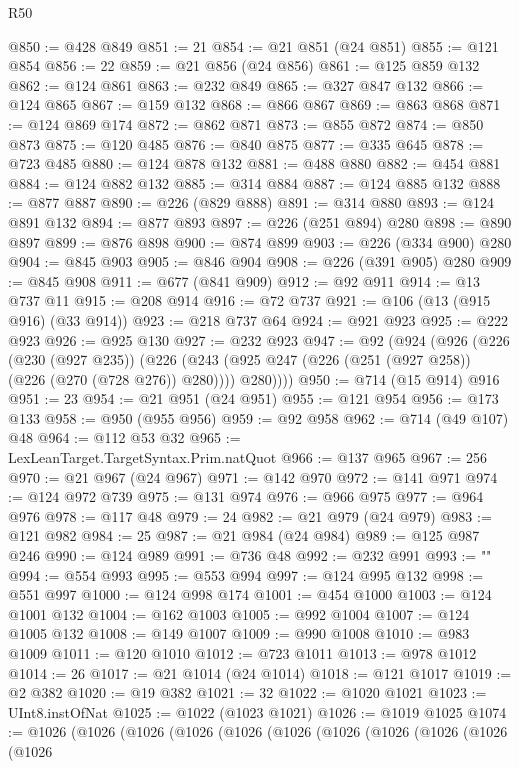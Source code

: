 \begin{lexlean}{R50}
\begin{coremodule}
@850 := @428 @849
@851 := 21
@854 := @21 @851 (@24 @851)
@855 := @121 @854
@856 := 22
@859 := @21 @856 (@24 @856)
@861 := @125 @859 @132
@862 := @124 @861
@863 := @232 @849
@865 := @327 @847 @132
@866 := @124 @865
@867 := @159 @132
@868 := @866 @867
@869 := @863 @868
@871 := @124 @869 @174
@872 := @862 @871
@873 := @855 @872
@874 := @850 @873
@875 := @120 @485
@876 := @840 @875
@877 := @335 @645
@878 := @723 @485
@880 := @124 @878 @132
@881 := @488 @880
@882 := @454 @881
@884 := @124 @882 @132
@885 := @314 @884
@887 := @124 @885 @132
@888 := @877 @887
@890 := @226 (@829 @888)
@891 := @314 @880
@893 := @124 @891 @132
@894 := @877 @893
@897 := @226 (@251 @894) @280
@898 := @890 @897
@899 := @876 @898
@900 := @874 @899
@903 := @226 (@334 @900) @280
@904 := @845 @903
@905 := @846 @904
@908 := @226 (@391 @905) @280
@909 := @845 @908
@911 := @677 (@841 @909)
@912 := @92 @911
@914 := @13 @737 @11
@915 := @208 @914
@916 := @72 @737
@921 := @106 (@13 (@915 @916) (@33 @914))
@923 := @218 @737 @64
@924 := @921 @923
@925 := @222 @923
@926 := @925 @130
@927 := @232 @923
@947 := @92
    (@924
      (@926
        (@226
          (@230 (@927 @235))
          (@226 (@243 (@925 @247 (@226 (@251 (@927 @258)) (@226 (@270 (@728 @276)) @280)))) @280))))
@950 := @714 (@15 @914) @916
@951 := 23
@954 := @21 @951 (@24 @951)
@955 := @121 @954
@956 := @173 @133
@958 := @950 (@955 @956)
@959 := @92 @958
@962 := @714 (@49 @107) @48
@964 := @112 @53 @32
@965 := LexLeanTarget.TargetSyntax.Prim.natQuot
@966 := @137 @965
@967 := 256
@970 := @21 @967 (@24 @967)
@971 := @142 @970
@972 := @141 @971
@974 := @124 @972 @739
@975 := @131 @974
@976 := @966 @975
@977 := @964 @976
@978 := @117 @48
@979 := 24
@982 := @21 @979 (@24 @979)
@983 := @121 @982
@984 := 25
@987 := @21 @984 (@24 @984)
@989 := @125 @987 @246
@990 := @124 @989
@991 := @736 @48
@992 := @232 @991
@993 := "\n"
@994 := @554 @993
@995 := @553 @994
@997 := @124 @995 @132
@998 := @551 @997
@1000 := @124 @998 @174
@1001 := @454 @1000
@1003 := @124 @1001 @132
@1004 := @162 @1003
@1005 := @992 @1004
@1007 := @124 @1005 @132
@1008 := @149 @1007
@1009 := @990 @1008
@1010 := @983 @1009
@1011 := @120 @1010
@1012 := @723 @1011
@1013 := @978 @1012
@1014 := 26
@1017 := @21 @1014 (@24 @1014)
@1018 := @121 @1017
@1019 := @2 @382
@1020 := @19 @382
@1021 := 32
@1022 := @1020 @1021
@1023 := UInt8.instOfNat
@1025 := @1022 (@1023 @1021)
@1026 := @1019 @1025
@1074 := @1026
    (@1026
      (@1026
        (@1026
          (@1026
            (@1026
              (@1026
                (@1026
                  (@1026
                    (@1026
                      (@1026

\end{coremodule}
\end{lexlean}
